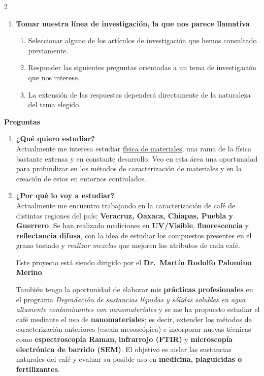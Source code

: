 \documentclass{article}
\begin{document}
\setlength{\columnsep}{2cm}
\begin{multicols}{2}

\begin{enumerate}[label={{\textcolor{trueblue}{\textbf{Ej}. \arabic*.0}}}, start=1]
    \item \textbf{Tomar nuestra línea de investigación, la que nos parece llamativa}
    \begin{enumerate}
        \item Seleccionar alguno de los artículos de investigación que hemos consultado previamente.
        \item Responder las siguientes preguntas orientadas a un tema de investigación que nos interese.
        \item La extensión de las respuestas dependerá directamente de la naturaleza del tema elegido.
    \end{enumerate}
\end{enumerate}

\textbf{Preguntas}

\begin{enumerate}[label={{\textcolor{trueblue}{\textbf{Ej}. \arabic*.0}}}, start=2]

    \item \textbf{¿Qué quiero estudiar?}\\[4pt]
    Actualmente me interesa estudiar \underline{física de materiales}, una rama de la física bastante extensa y en constante desarrollo. Veo en esta área una oportunidad para profundizar en los métodos de caracterización de materiales y en la creación de estos en entornos controlados. 

    \item \textbf{¿Por qué lo voy a estudiar?}\\[4pt]
    Actualmente me encuentro trabajando en la caracterización de café de distintas regiones del país: \textbf{Veracruz, Oaxaca, Chiapas, Puebla y Guerrero}.  
    Se han realizado mediciones en \textbf{UV/Visible}, \textbf{fluorescencia} y \textbf{reflectancia difusa}, con la idea de estudiar los compuestos presentes en el grano tostado y \textit{realizar mezclas} que mejoren los atributos de cada café.

    Este proyecto está siendo dirigido por el \textbf{Dr.~Martín Rodolfo Palomino Merino}.  

    También tengo la oportunidad de elaborar mis \textbf{prácticas profesionales} en el programa \emph{Degradación de sustancias líquidas y sólidas solubles en agua altamente contaminantes con nanomateriales} y se me ha propuesto estudiar el café mediante el uso de \textbf{nanomateriales}; es decir, extender los métodos de caracterización anteriores (escala mesoscópica) e incorporar nuevas técnicas como \textbf{espectroscopía Raman}, \textbf{infrarrojo (FTIR)} y \textbf{microscopía electrónica de barrido (SEM)}.  
    El objetivo es aislar las sustancias naturales del café y evaluar su posible uso en \textbf{medicina, plaguicidas o fertilizantes}.  


\end{enumerate}
\end{multicols}
\end{document}
